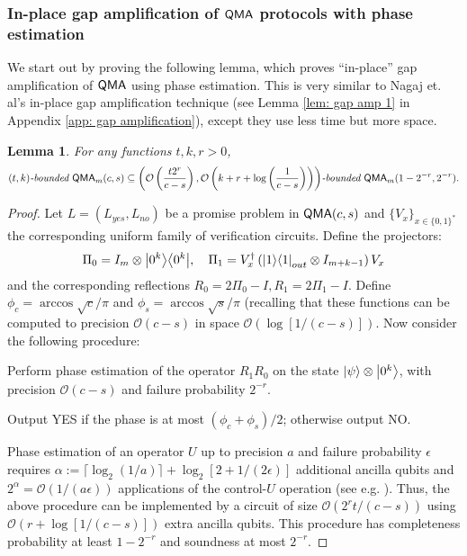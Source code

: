 \documentclass[11pt]{article}
\newtheorem{lemma}[theorem]{Lemma}
\theoremstyle{definition}
\theoremstyle{remark}
\newcommand\QMA{{\sf{QMA}}}
\newcommand\bddQMA[5]{{\left(#1,#2\right)}\textit{-bounded }\QMA_{#3}(#4,#5)}
\newcommand\bigoh{\mathcal{O}}
\begin{document}
\subsubsection {In-place gap amplification of $\QMA$ protocols with phase estimation}
We start out by proving the following lemma, which proves ``in-place'' gap amplification of $\QMA$ using phase estimation.
This is very similar to Nagaj et. al's in-place gap amplification technique \cite{nwz11} (see Lemma \ref{lem: gap amp 1} in Appendix \ref{app: gap amplification}), except they use less time but more space.
\begin{lemma} \label{lem: gap amp 2}
For any functions $t,k,r>0$, 
\[
\bddQMA{t}{k}{m}{c}{s}\subseteq\bddQMA{\mathcal{O}\left(\frac{t2^r}{c-s}\right)}{\mathcal{O}\left(k+r+\log\left(\frac{1}{c-s}\right)\right)}{m}{1-2^{-r}}{2^{-r}}.
\]
\end{lemma}
\begin{proof}
	Let $L=(L_{yes}, L_{no})$ be a promise problem in $\QMA(c,s)$ and $\{V_x\}_{x\in\{0,1\}^*}$ the corresponding uniform family of verification circuits.
Define the projectors:
\begin{equation}
\Pi_0 = I_m \otimes {\left\vert{0^k}\right\rangle}{\left\langle{0^k}\right\vert}, \quad \Pi_1 = V^\dagger_x \left({\left\vert{1}\right\rangle}{\left\langle{1}\right\vert}_{out} \otimes I_{m+k-1}\right) V_x
\end{equation}
and the corresponding reflections
$R_0 = 2\Pi_0 - I, R_1 = 2\Pi_1 - I$.
Define $\phi_c = \arccos\sqrt{c}/\pi$ and $\phi_s = \arccos\sqrt{s}/\pi$ (recalling that these functions can be computed to precision $\bigoh (c-s)$ in space $\bigoh (\log[1/(c-s)])$. 
Now consider the following procedure:
\begin{compactenum}
\item Perform phase estimation of the operator $R_1R_0$ on the state ${\left\vert{\psi}\right\rangle}\otimes {\left\vert{0^k}\right\rangle}$, with precision $\bigoh (c-s)$ and failure probability $2^{-r}$.
\item Output YES if the phase is at most $(\phi_{c}+\phi_{s})/2$; otherwise output NO.
\end{compactenum}
Phase estimation of an operator $U$ up to precision $a$ and failure probability $\epsilon$ requires $\alpha := \lceil\log_2(1/a)\rceil + \log_2[2+1/(2\epsilon)]$ additional ancilla qubits and $2^\alpha = \mathcal{O}(1/(a\epsilon))$ applications of the control-$U$ operation (see e.g. \cite{nc00}).  Thus, the above procedure can be implemented by a circuit of size $\mathcal{O}(2^{r}t/(c-s))$ using $\mathcal{O}(r+\log[1/(c-s)])$ extra ancilla qubits. This procedure has completeness probability at least $1-2^{-r}$ and soundness at most $2^{-r}$.
\end{proof}
\end{document}
